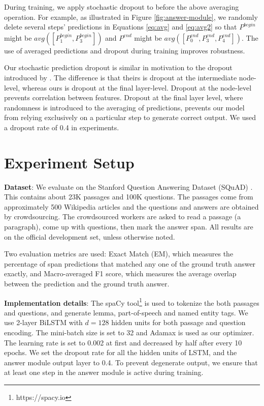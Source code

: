 \documentclass[11pt,a4paper]{article}
\begin{document}
During training, we apply stochastic dropout to before the above averaging operation. For example, as illustrated in Figure \ref{fig:answer-module}, we randomly delete several steps' predictions in Equations \ref{eq:avg} and \ref{eq:avg2} so that $P^{begin}$ might be $avg([P_1^{begin}, P_3^{begin}])$ and $P^{end}$ might be $avg([P_0^{end}, P_3^{end}, P_{4}^{end}])$. The use of averaged predictions and dropout during training improves robustness. 

Our stochastic prediction dropout is similar in motivation to the dropout introduced by \cite{srivastava2014dropout}. The difference is that theirs is dropout at the intermediate node-level, whereas ours is dropout at the final layer-level.
Dropout at the node-level prevents correlation between features. 
Dropout at the final layer level, where randomness is introduced to the averaging of predictions, prevents our model from relying exclusively on a particular step to generate correct output. 
We used a dropout rate of 0.4 in experiments.

\section{Experiment Setup}
\label{sec:exp}
\vspace{-0.1cm}
\textbf{Dataset}: We evaluate on the Stanford Question Answering Dataset (SQuAD) \cite{rajpurkar2016squad}. This contains about 23K passages and 100K questions. The passages come from approximately 500 Wikipedia articles and the questions and answers are obtained by crowdsourcing. The crowdsourced workers are asked to read a passage (a paragraph), come up with questions, then mark the answer span. All results are on the official development set, unless otherwise noted. 

Two evaluation metrics are used: Exact Match (EM), which measures the percentage of span predictions that matched any one of the ground truth answer exactly, and Macro-averaged F1 score, which measures the average overlap between the prediction and the ground truth answer. 

\textbf{Implementation details}: The spaCy tool\footnote{https://spacy.io} is used to tokenize the both passages and questions, and generate lemma, part-of-speech and named entity tags. We use 2-layer BiLSTM with $d=128$ hidden units for both passage and question encoding. The mini-batch size is set to 32 and Adamax \cite{kingma2014adam} is used as our optimizer. The learning rate is set to 0.002 at first and decreased by half after every 10 epochs. We set the dropout rate for all the hidden units of LSTM, and the answer module output layer to 0.4. To prevent degenerate output, we ensure that at least one step in the answer module is active during training.
\end{document}
